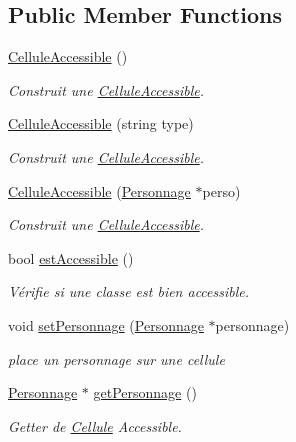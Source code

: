 \subsection*{Public Member Functions}
\begin{DoxyCompactItemize}
\item 
\hypertarget{classCelluleAccessible_a77f732f05d55c73361b9effe1428d3c6}{\hyperlink{classCelluleAccessible_a77f732f05d55c73361b9effe1428d3c6}{Cellule\-Accessible} ()}\label{classCelluleAccessible_a77f732f05d55c73361b9effe1428d3c6}

\begin{DoxyCompactList}\small\item\em Construit une \hyperlink{classCelluleAccessible}{Cellule\-Accessible}. \end{DoxyCompactList}\item 
\hyperlink{classCelluleAccessible_a0b70c93dc19145360f8064093dc4c204}{Cellule\-Accessible} (string type)
\begin{DoxyCompactList}\small\item\em Construit une \hyperlink{classCelluleAccessible}{Cellule\-Accessible}. \end{DoxyCompactList}\item 
\hyperlink{classCelluleAccessible_aaafd63dae10bff86a9602352c33a8d8a}{Cellule\-Accessible} (\hyperlink{classPersonnage}{Personnage} $\ast$perso)
\begin{DoxyCompactList}\small\item\em Construit une \hyperlink{classCelluleAccessible}{Cellule\-Accessible}. \end{DoxyCompactList}\item 
bool \hyperlink{classCelluleAccessible_a4250e365bbcb5a1b335d01bc3047cad5}{est\-Accessible} ()
\begin{DoxyCompactList}\small\item\em Vérifie si une classe est bien accessible. \end{DoxyCompactList}\item 
void \hyperlink{classCelluleAccessible_a83ccd256af299bf8d380611594c68548}{set\-Personnage} (\hyperlink{classPersonnage}{Personnage} $\ast$personnage)
\begin{DoxyCompactList}\small\item\em place un personnage sur une cellule \end{DoxyCompactList}\item 
\hyperlink{classPersonnage}{Personnage} $\ast$ \hyperlink{classCelluleAccessible_a2b7238e08a989a80b59022f77f6a22fa}{get\-Personnage} ()
\begin{DoxyCompactList}\small\item\em Getter de \hyperlink{classCellule}{Cellule} Accessible. \end{DoxyCompactList}\end{DoxyCompactItemize}


